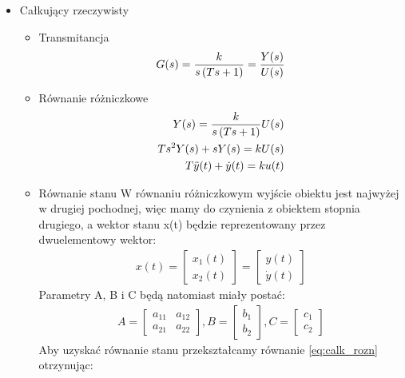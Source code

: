 \documentclass[a4paper,10pt]{article}
\begin{document}
\begin{itemize}
\begin{itemize}
\end{itemize}

\item Całkujący rzeczywisty

\begin{itemize}
\item Transmitancja	
	\begin{eqnarray}
		G(s)= {k \over {s \left( Ts + 1 \right) }} = {Y(s) \over U(s)}
	\end{eqnarray}
\item Równanie różniczkowe
	\begin{eqnarray} 
		\nonumber Y(s) = {k \over {s \left( Ts + 1 \right) }} U(s)\\ 
		\nonumber Ts^{2}Y(s) + sY(s) = kU(s)\\
		T\ddot{y}(t) + \dot{y}(t) = ku(t) \label{eq:calk_rozn}
	\end{eqnarray}
\item Równanie stanu
\newline W równaniu różniczkowym wyjście obiektu jest najwyżej w drugiej pochodnej, więc mamy do czynienia z obiektem stopnia drugiego, a wektor stanu x(t) będzie reprezentowany przez dwuelementowy wektor:
 	\begin{eqnarray}
		\nonumber x(t) = \left[ 
			\begin{array}{l}
				x_{1}(t)\\
				x_{2}(t)
			\end{array}
		\right] = \left[ 
			\begin{array}{l}
				y(t)\\
				\dot{y}(t)
			\end{array}
		\right]
	\end{eqnarray}
Parametry A, B i C będą natomiast miały postać:
	\begin{eqnarray}
		\nonumber A = \left[ 
			\begin{array}{ll}
				a_{11} & a_{12}\\
				a_{21} & a_{22}
			\end{array}
		\right], B = \left[ 
			\begin{array}{l}
				b_{1}\\
				b_{2}
			\end{array}
		\right], C = \left[ 
			\begin{array}{l}
				c_{1}\\
				c_{2}
			\end{array}
		\right]
	\end{eqnarray}
Aby uzyskać równanie stanu przekształcamy równanie \ref{eq:calk_rozn} otrzynując:

\end{itemize}
\end{itemize}
\end{document}

